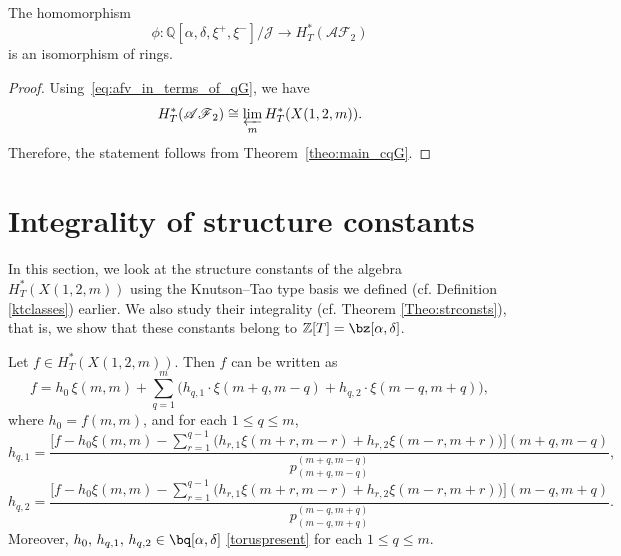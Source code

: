 \documentclass[10pt, a4paper, reqno]{amsart}
\begin{document}
\begin{coro}\label{theo:main_afg}
	The homomorphism 
	\[
	\phi: \mathbb{Q}[\alpha, \delta, \xi^+,\xi^-] / \mathcal{J} \longrightarrow H^*_T(\mathscr{AF}_2)
	\]
	is an isomorphism of rings.
\end{coro}

\begin{proof}
	Using~\eqref{eq:afv_in_terms_of_qG}, we have
	\[
	H^*_T(\mathscr{AF}_2) \cong \varprojlim_m H^*_T(X(1,2,m)).
	\]
	Therefore, the statement follows from Theorem~\ref{theo:main_cqG}.
\end{proof}









\section{Integrality of structure constants  }\label{s:int_str_cons}
In this section, we look at the structure constants of the algebra $H^*_T(X(1,2,m))$ using the Knutson--Tao type basis we defined (cf. Definition \ref{ktclasses}) earlier. We also study their integrality (cf. Theorem \ref{Theo:strconsts}), that is, we show that these constants belong to $\mathbb{Z}[T]=\bz[\alpha, \delta]$.

	
\begin{lema}\label{Lem:strconsts}
		Let $f \in H^*_T(X(1,2,m))$. Then $f$ can be written as 
		\begin{equation}\label{5.46}
		f = h_0 \, \xi(m,m) + \sum_{q=1}^{m} \big( h_{q,1} \cdot \xi(m+q,m-q) + h_{q,2} \cdot \xi(m-q,m+q) \big),
		\end{equation}
		where $h_0 = f(m,m)$, and for each $1 \le q \le m$,
		\[
		h_{q,1} = 
		\frac{\Big[f - h_0 \xi(m,m) - \sum_{r=1}^{q-1} 
			\big(h_{r,1} \xi(m+r,m-r) + h_{r,2} \xi(m-r,m+r)\big)\Big](m+q,m-q)}
		{p^{(m+q,m-q)}_{(m+q,m-q)}},
		\]
		\[
		h_{q,2} = 
		\frac{\big[f - h_0 \xi(m,m) - \sum_{r=1}^{q-1} 
			\Big(h_{r,1} \xi(m+r,m-r) + h_{r,2} \xi(m-r,m+r)\big)\Big](m-q,m+q)}
		{p^{(m-q,m+q)}_{(m-q,m+q)}}.
		\]
		Moreover, $h_0,\, h_{q,1},\, h_{q,2} \in \bq[\alpha, \delta]$ \eqref{toruspresent} for each $1 \le q \le m$.
\end{lema}
	


	
	
\end{document}
